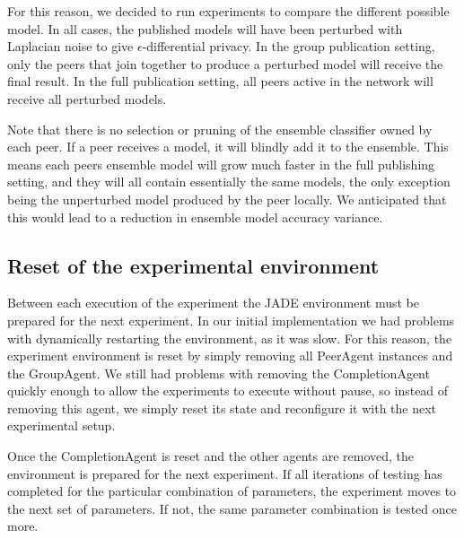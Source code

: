 For this reason, we decided to run experiments to compare the different possible model. In all cases, the published models will have been perturbed with Laplacian noise to give $\epsilon$-differential privacy. In the group publication setting, only the peers that join together to produce a perturbed model will receive the final result. In the full publication setting, all peers active in the network will receive all perturbed models. 

Note that there is no selection or pruning of the ensemble classifier owned by each peer. If a peer receives a model, it will blindly add it to the ensemble. This means each peers ensemble model will grow much faster in the full publishing setting, and they will all contain essentially the same models, the only exception being the unperturbed model produced by the peer locally. We anticipated that this would lead to a reduction in ensemble model accuracy variance.


\subsection{Reset of the experimental environment}

Between each execution of the experiment the JADE environment must be prepared for the next experiment. In our initial implementation we had problems with dynamically restarting the environment, as it was slow. For this reason, the experiment environment is reset by simply removing all PeerAgent instances and the GroupAgent. We still had problems with removing the CompletionAgent quickly enough to allow the experiments to execute without pause, so instead of removing this agent, we simply reset its state and reconfigure it with the next experimental setup.

Once the CompletionAgent is reset and the other agents are removed, the environment is prepared for the next experiment. If all iterations of testing has completed for the particular combination of parameters, the experiment moves to the next set of parameters. If not, the same parameter combination is tested once more.